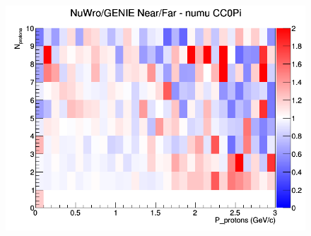 \begin{figure}[h]
\endminipage
{}
\includegraphics[width=\linewidth]{N_P/nominal/protons/ratios/CC0Pi_NuWro_GENIE_numu_NF_N_P.png}
\endminipage
\newline
\end{figure}
\clearpage
